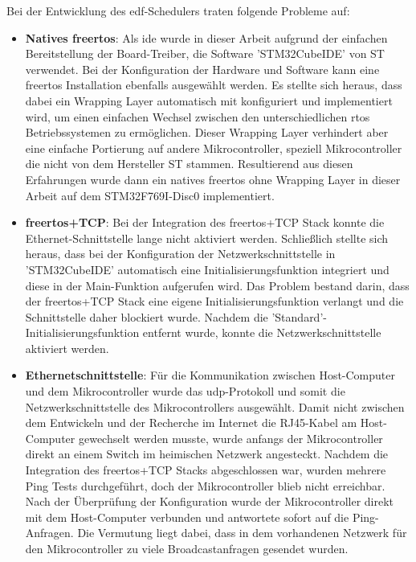 \documentclass[../EDF Master Thesis.tex]{subfiles}
\begin{document}
    Bei der Entwicklung des \ac{edf}-Schedulers traten folgende Probleme auf:
    \begin{itemize}
        \item \textbf{Natives \ac{freertos}}: Als \ac{ide} wurde in dieser Arbeit aufgrund der einfachen Bereitstellung der Board-Treiber, die Software 'STM32CubeIDE' von ST verwendet.
            Bei der Konfiguration der Hardware und Software kann eine \ac{freertos} Installation ebenfalls ausgewählt werden.
            Es stellte sich heraus, dass dabei ein Wrapping Layer automatisch mit konfiguriert und implementiert wird, um einen einfachen Wechsel zwischen den unterschiedlichen \ac{rtos} Betriebssystemen zu ermöglichen.
            Dieser Wrapping Layer verhindert aber eine einfache Portierung auf andere Mikrocontroller, speziell Mikrocontroller die nicht von dem Hersteller ST stammen.
            Resultierend aus diesen Erfahrungen wurde dann ein natives \ac{freertos} ohne Wrapping Layer in dieser Arbeit auf dem STM32F769I-Disc0 implementiert.
        \item \textbf{\ac{freertos}+TCP}: Bei der Integration des \ac{freertos}+TCP Stack konnte die Ethernet-Schnittstelle lange nicht aktiviert werden.
            Schließlich stellte sich heraus, dass bei der Konfiguration der Netzwerkschnittstelle in 'STM32CubeIDE' automatisch eine Initialisierungsfunktion integriert und diese in der Main-Funktion aufgerufen wird.
            Das Problem bestand darin, dass der \ac{freertos}+TCP Stack eine eigene Initialisierungsfunktion verlangt und die Schnittstelle daher blockiert wurde.
            Nachdem die 'Standard'-Initialisierungsfunktion entfernt wurde, konnte die Netzwerkschnittstelle aktiviert werden.
        \item \textbf{Ethernetschnittstelle}: Für die Kommunikation zwischen Host-Computer und dem Mikrocontroller wurde das \ac{udp}-Protokoll und somit die Netzwerkschnittstelle des Mikrocontrollers ausgewählt.
            Damit nicht zwischen dem Entwickeln und der Recherche im Internet die RJ45-Kabel am Host-Computer gewechselt werden musste, wurde anfangs der Mikrocontroller direkt an einem Switch im heimischen Netzwerk angesteckt.
            Nachdem die Integration des \ac{freertos}+TCP Stacks abgeschlossen war, wurden mehrere Ping Tests durchgeführt, doch der Mikrocontroller blieb nicht erreichbar.
            Nach der Überprüfung der Konfiguration wurde der Mikrocontroller direkt mit dem Host-Computer verbunden und antwortete sofort auf die Ping-Anfragen.
            Die Vermutung liegt dabei, dass in dem vorhandenen Netzwerk für den Mikrocontroller zu viele Broadcastanfragen gesendet wurden.

\end{itemize}
\end{document}
